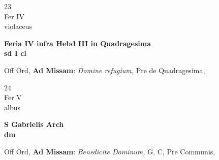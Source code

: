 \documentclass[10pt, openany]{book}
\begin{document}
        \begin{center}
            \begin{minipage}{3.5in}
                \vspace{2em}
                \begin{minipage}{0.5in}
                    {\Huge 23} \\
                    {\normalsize Fer IV} \\
                    {\normalsize violaceus}
                \end{minipage}
                \begin{minipage}{3.0in}
                    \textbf{ \large Feria IV infra Hebd III in Quadragesima \\
                    \textnormal{\normalsize sd I cl}} \\ 
                \end{minipage}
                \begin{justify}Off Ord, \textbf{Ad Missam}: \textit{Domine refugium,} Pre de Quadragesima,  
                \end{justify}
            \end{minipage}
        \end{center}
    
        \begin{center}
            \begin{minipage}{3.5in}
                \vspace{2em}
                \begin{minipage}{0.5in}
                    {\Huge 24} \\
                    {\normalsize Fer V} \\
                    {\normalsize albus}
                \end{minipage}
                \begin{minipage}{3.0in}
                    \textbf{ \large S Gabrielis Arch \\
                    \textnormal{\normalsize dm}} \\ 
                \end{minipage}
                \begin{justify}Off Ord, \textbf{Ad Missam}: \textit{Benedicite Dominum,} G, C, Pre Communis,  
                \end{justify}
            \end{minipage}
        \end{center}
    
\end{document}
